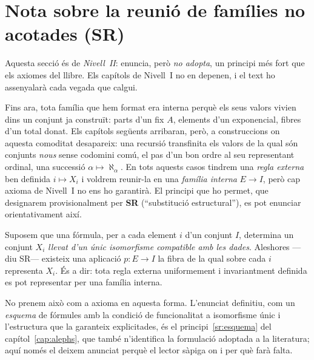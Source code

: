 \section{Nota sobre la reunió de famílies no acotades (SR)}\label{sec:sr}

\begin{nota}
Aquesta secció és de \emph{Nivell~II}: enuncia, però \emph{no adopta},
un principi més fort que els axiomes del llibre. Els capítols de Nivell~I no
en depenen, i el text ho assenyalarà cada vegada que calgui.
\end{nota}

Fins ara, tota família que hem format era interna perquè els seus valors
vivien dins un conjunt ja construït: parts d'un fix \(A\), elements d'un
exponencial, fibres d'un total donat. Els capítols següents arribaran, però,
a construccions on aquesta comoditat desapareix: una recursió transfinita els
valors de la qual són conjunts \emph{nous} sense codomini comú, el pas d'un
bon ordre al seu representant ordinal, una successió \(\alpha\mapsto\aleph_\alpha\).
En tots aquests casos tindrem una \emph{regla externa} ben definida
\(i\mapsto X_i\) i voldrem reunir-la en una \emph{família interna} \(E\to I\),
però cap axioma de Nivell~I no ens ho garantirà. El principi que ho permet,
que designarem provisionalment per \textbf{SR} (\enquote{substitució
estructural}), es pot enunciar orientativament així.

\begin{observacio}\label{obs:sr}
Suposem que una fórmula, per a cada element \(i\) d'un conjunt \(I\),
determina un conjunt \(X_i\) \emph{llevat d'un únic isomorfisme compatible
amb les dades}. Aleshores ---diu SR--- existeix una aplicació \(p\colon E\to
I\) la fibra de la qual sobre cada \(i\) representa \(X_i\). És a dir: tota
regla externa uniformement i invariantment definida es pot representar per
una família interna.

No prenem això com a axioma en aquesta forma. L'enunciat definitiu, com un
\emph{esquema} de fórmules amb la condició de funcionalitat a isomorfisme
únic i l'estructura que la garanteix explicitades, és el
principi~\ref{sr:esquema} del capítol~\ref{cap:alephs}, que també n'identifica
la formulació adoptada a la literatura; aquí només el deixem anunciat
perquè el lector sàpiga on i per què farà falta.
\end{observacio}

